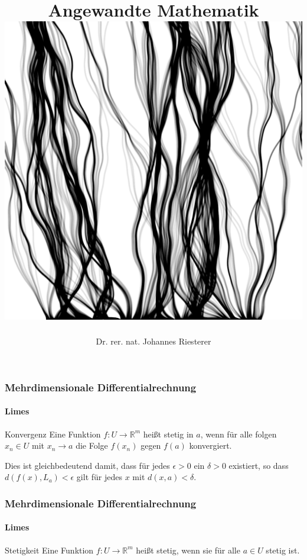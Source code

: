 \documentclass{beamer}
\begin{document}
\title[Angewandte Mathematik] %
{Angewandte Mathematik
\\
\includegraphics[scale=0.15]{images/cover}
}
\subtitle{}
\author[Dr. Johannes Riesterer] %
{Dr.  rer. nat. Johannes Riesterer}

\date[KPT 2004] %
{}

\subject{Angewandte Mathematik}



\begin{frame}
    \frametitle{Mehrdimensionale Differentialrechnung}
\framesubtitle{Limes}
    \begin{block}{Konvergenz}
Eine Funktion $f :U \to \mathbb{R}^m$ heißt stetig in $a$, wenn für alle folgen $x_n  \in U$  mit $x_n \to a$ die Folge $f(x_n)$ gegen $f(a)$ konvergiert.

Dies ist gleichbedeutend damit, dass für jedes $\epsilon > 0$ ein $\delta > 0$ existiert, so dass
$d(f(x) ,L_a) < \epsilon$ gilt für jedes $x$ mit $d(x, a) < \delta$.
\end{block}

 \end{frame}


\begin{frame}
    \frametitle{Mehrdimensionale Differentialrechnung}
\framesubtitle{Limes}
    \begin{block}{Stetigkeit}
Eine Funktion $f :U \to \mathbb{R}^m$ heißt stetig, wenn sie für alle $a \in U$ stetig ist.
\end{block}

 \end{frame}
\end{document}
